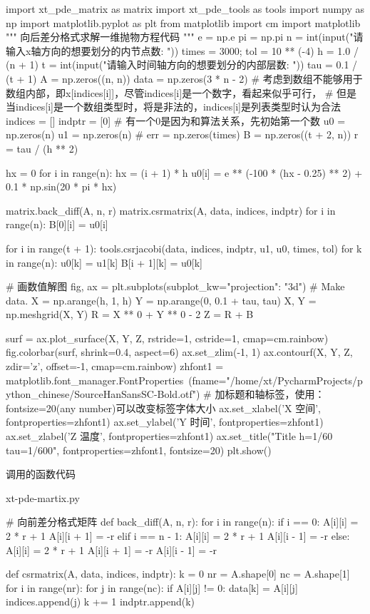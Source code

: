 \documentclass[UTF8]{ctexart}
\begin{document}
\begin{python}
import xt_pde_matrix as matrix
import xt_pde_tools as tools
import numpy as np
import matplotlib.pyplot as plt
from matplotlib import cm
import matplotlib
"""
向后差分格式求解一维抛物方程代码
"""
e = np.e
pi = np.pi
n = int(input("请输入x轴方向的想要划分的内节点数: "))
times = 3000;
tol = 10 ** (-4)
h = 1.0 / (n + 1)
t = int(input("请输入时间轴方向的想要划分的内部层数: "))
tau = 0.1 / (t + 1)
A = np.zeros((n, n))
data = np.zeros(3 * n - 2)
# 考虑到数组不能够用于数组内部，即x[indices[i]]，尽管indices[i]是一个数字，看起来似乎可行，
# 但是当indices[i]是一个数组类型时，将是非法的，indices[i]是列表类型时认为合法
indices = []
indptr = [0]  # 有一个0是因为和算法关系，先初始第一个数
u0 = np.zeros(n)
u1 = np.zeros(n)
# err = np.zeros(times)
B = np.zeros((t + 2, n))
r = tau / (h ** 2)

hx = 0
for i in range(n):
    hx = (i + 1) * h
    u0[i] = e ** (-100 * (hx - 0.25) ** 2) + 0.1 * np.sin(20 * pi * hx)

matrix.back_diff(A, n, r)
matrix.csrmatrix(A, data, indices, indptr)
for i in range(n):
    B[0][i] = u0[i]

for i in range(t + 1):
    tools.csrjacobi(data, indices, indptr, u1, u0, times, tol)
    for k in range(n):
        u0[k] = u1[k]
        B[i + 1][k] = u0[k]

# 画数值解图
fig, ax = plt.subplots(subplot_kw={"projection": "3d"})
# Make data.
X = np.arange(h, 1, h)
Y = np.arange(0, 0.1 + tau, tau)
X, Y = np.meshgrid(X, Y)
R = X ** 0 + Y ** 0 - 2
Z = R + B

surf = ax.plot_surface(X, Y, Z, rstride=1, cstride=1, cmap=cm.rainbow)
fig.colorbar(surf, shrink=0.4, aspect=6)
ax.set_zlim(-1, 1)
ax.contourf(X, Y, Z, zdir='z', offset=-1, cmap=cm.rainbow)
zhfont1 = matplotlib.font_manager.FontProperties\
    (fname="/home/xt/PycharmProjects/python_chinese/SourceHanSansSC-Bold.otf")
# 加标题和轴标签，使用：fontsize=20(any number)可以改变标签字体大小
ax.set_xlabel('X 空间', fontproperties=zhfont1)
ax.set_ylabel('Y 时间', fontproperties=zhfont1)
ax.set_zlabel('Z 温度', fontproperties=zhfont1)
ax.set_title("Title h=1/60 tau=1/600", fontproperties=zhfont1, fontsize=20)
plt.show()
\end{python}

调用的函数代码

xt-pde-martix.py

\begin{python}
# 向前差分格式矩阵
def back_diff(A, n, r):
    for i in range(n):
        if i == 0:
            A[i][i] = 2 * r + 1
            A[i][i + 1] = -r
        elif i == n - 1:
            A[i][i] = 2 * r + 1
            A[i][i - 1] = -r
        else:
            A[i][i] = 2 * r + 1
            A[i][i + 1] = -r
            A[i][i - 1] = -r
            
def csrmatrix(A, data, indices, indptr):
    k = 0
    nr = A.shape[0]
    nc = A.shape[1]
    for i in range(nr):
        for j in range(nc):
            if A[i][j] != 0:
                data[k] = A[i][j]
                indices.append(j)
                k += 1
        indptr.append(k)
\end{python}
\end{document}
